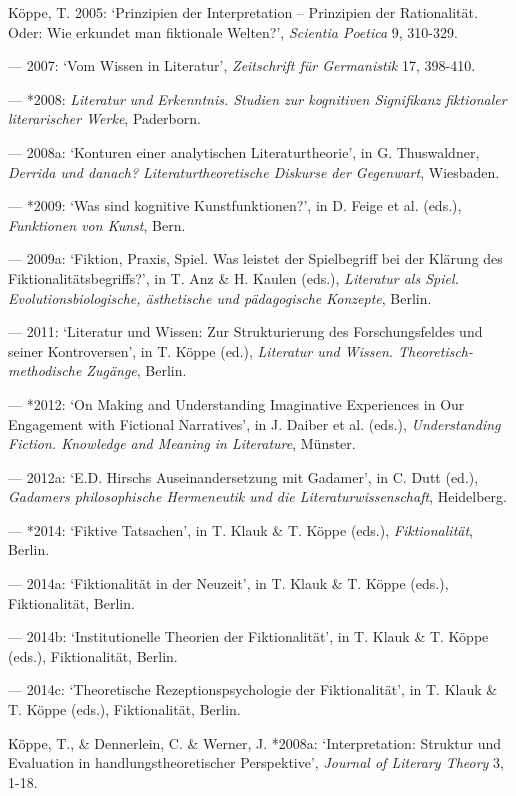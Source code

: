 \begin{hangparas}{.5cm}{1}
K\"oppe, T. 2005: `Prinzipien der Interpretation -- Prinzipien der Rationalit\"at. Oder: Wie erkundet man fiktionale Welten?', \emph{Scientia Poetica} 9, 310-329.

--- 2007: `Vom Wissen in Literatur', \emph{Zeitschrift f\"ur Germanistik} 17, 398-410.

--- *2008: \emph{Literatur und Erkenntnis. Studien zur kognitiven Signifikanz fiktionaler literarischer Werke}, Paderborn. 

--- 2008a: `Konturen einer analytischen Literaturtheorie', in G. Thuswaldner, \emph{Derrida und danach? Literaturtheoretische Diskurse der Gegenwart}, Wiesbaden.

--- *2009: `Was sind kognitive Kunstfunktionen?', in D. Feige et al. (eds.), \emph{Funktionen von Kunst}, Bern.

--- 2009a: `Fiktion, Praxis, Spiel. Was leistet der Spielbegriff bei der Kl\"arung des Fiktionalit\"atsbegriffs?', in T. Anz \& H. Kaulen (eds.), \emph{Literatur als Spiel.  Evolutionsbiologische, \"asthetische und p\"adagogische Konzepte}, Berlin.

--- 2011: `Literatur und Wissen: Zur Strukturierung des Forschungsfeldes und seiner Kontroversen', in T. K\"oppe (ed.), \emph{Literatur und Wissen. Theoretisch-methodische Zug\"ange}, Berlin.

--- *2012: `On Making and Understanding Imaginative Experiences in Our Engagement with Fictional Narratives', in J. Daiber et al. (eds.), \emph{Understanding Fiction. Knowledge and Meaning in Literature}, M\"unster.

--- 2012a: `E.D. Hirschs Auseinandersetzung mit Gadamer', in C. Dutt (ed.), \emph{Gadamers philosophische Hermeneutik und die Literaturwissenschaft}, Heidelberg.

--- *2014: `Fiktive Tatsachen', in T. Klauk \& T. K\"oppe (eds.), \emph{Fiktionalit\"at}, Berlin.

--- 2014a: `Fiktionalit\"at in der Neuzeit', in T. Klauk \& T. K\"oppe (eds.), Fiktionalit\"at, Berlin.

--- 2014b: `Institutionelle Theorien der Fiktionalit\"at', in T. Klauk \& T. K\"oppe (eds.), Fiktionalit\"at, Berlin. 

--- 2014c: `Theoretische Rezeptionspsychologie der Fiktionalit\"at', in T. Klauk \& T. K\"oppe (eds.), Fiktionalit\"at, Berlin.

K\"oppe, T., \& Dennerlein, C. \& Werner, J. *2008a: `Interpretation: Struktur und Evaluation in handlungstheoretischer Perspektive', \emph{Journal of Literary Theory} 3, 1-18.


\end{hangparas}

